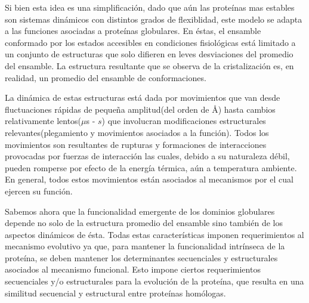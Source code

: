 Si bien esta idea es una simplificación, dado que aún las proteínas mas estables son sistemas dinámicos con distintos grados de flexiblidad, este modelo se adapta a las funciones asociadas a proteínas globulares.
En éstas, el ensamble conformado por los estados accesibles en condiciones fisiológicas está limitado a un conjunto de estructuras que solo difieren en leves desviaciones del promedio del ensamble.
La estructura resultante que se observa de la cristalización es, en realidad, un promedio del ensamble de conformaciones.

La dinámica de estas estructuras está dada por movimientos que van desde fluctuaciones rápidas de pequeña amplitud(del orden de \AA) hasta cambios relativamente lentos($\mu$s - $s$) que 
involucran modificaciones estructurales relevantes(plegamiento y movimientos asociados a la función).
Todos los movimientos son resultantes de rupturas y formaciones de interacciones provocadas por fuerzas de interacción las cuales, debido a su naturaleza débil, pueden romperse 
por efecto de la energía térmica, aún a temperatura ambiente. En general, todos estos movimientos están asociados al mecanismos por el cual ejercen su función.






Sabemos ahora que la funcionalidad emergente de los dominios globulares depende no solo de la estructura promedio del ensamble sino también de los aspectos dinámicos de ésta.
Todas estas características imponen requerimientos al mecanismo evolutivo ya que, para mantener la funcionalidad intrínseca de la proteína, se deben mantener los determinantes secuenciales y estructurales asociados al mecanismo funcional.
Esto impone ciertos requerimientos secuenciales y/o estructurales para la evolución de la proteína, que resulta en una similitud secuencial y estructural entre proteínas homólogas.

